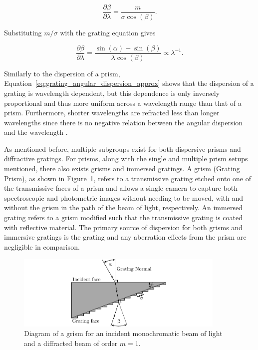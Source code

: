 \begin{equation}
    \frac{\partial \beta}{\partial \lambda} = \frac{m}{\sigma \cos(\beta)}.
    \label{eq:grating_angular_dispersion}
\end{equation}

\noindent Substituting $m / \sigma$ with the grating equation gives

\begin{equation}
    \frac{\partial \beta}{\partial \lambda} = \frac{\sin(\alpha) + \sin(\beta)}{\lambda \cos(\beta)} \propto \lambda^{-1}.
    \label{eq:grating_angular_dispersion_approx}
\end{equation}

Similarly to the dispersion of a prism, Equation~\ref{eq:grating_angular_dispersion_approx} shows that the dispersion of a grating is wavelength dependent, but this dependence is only inversely proportional and thus more uniform across a wavelength range than that of a prism. Furthermore, shorter wavelengths are refracted less than longer wavelengths since there is no negative relation between the angular dispersion and the wavelength \citep{BirneyObsAstro, Hecht_optics}.
\prgph

As mentioned before, multiple subgroups exist for both dispersive prisms and diffractive gratings. For prisms, along with the single and multiple prism setups mentioned, there also exists grisms and immersed gratings. A grism (Grating Prism), as shown in Figure~\ref{fig:grism}, refers to a transmissive grating etched onto one of the transmissive faces of a prism and allows a single camera to capture both spectroscopic and photometric images without needing to be moved, with and without the grism in the path of the beam of light, respectively. An immersed grating refers to a grism modified such that the transmissive grating is coated with reflective material. The primary source of dispersion for both grisms and immersive gratings is the grating and any aberration effects from the prism are negligible in comparison.
\prgph

\begin{figure}[t]
    \centering
    \includegraphics[width = 10cm]{figures/2_grism.pdf}
    \caption{Diagram of a grism for an incident monochromatic beam of light and a diffracted beam of order $m = 1$.}
    \label{fig:grism}
\end{figure}


